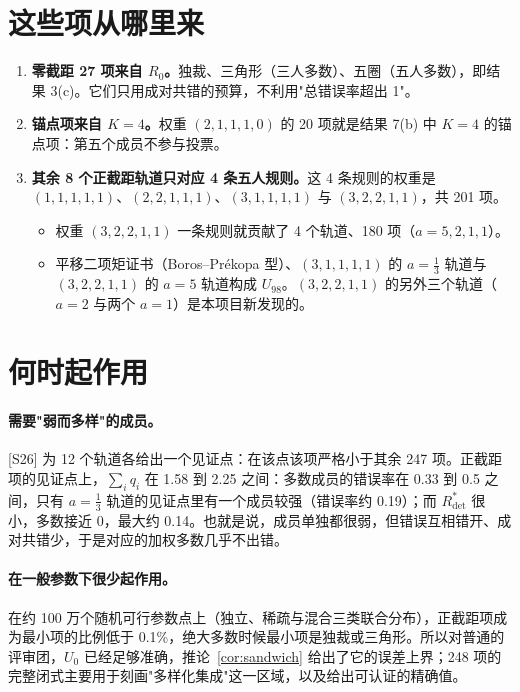 \documentclass[11pt,a4paper]{article}
\theoremstyle{remark}
\newcommand{\Rdet}{R^*_{\mathrm{det}}}
\begin{document}
\section{这些项从哪里来}

\begin{enumerate}
\item \textbf{零截距 27 项来自 $R_0$。}独裁、三角形（三人多数）、五圈（五人多数），即结果 3(c)。它们只用成对共错的预算，不利用"总错误率超出 1"。
\item \textbf{锚点项来自 $K=4$。}权重 $(2,1,1,1,0)$ 的 20 项就是结果 7(b) 中 $K=4$ 的锚点项：第五个成员不参与投票。
\item \textbf{其余 8 个正截距轨道只对应 4 条五人规则。}这 4 条规则的权重是 $(1,1,1,1,1)$、$(2,2,1,1,1)$、$(3,1,1,1,1)$ 与 $(3,2,2,1,1)$，共 201 项。
  \begin{itemize}
  \item 权重 $(3,2,2,1,1)$ 一条规则就贡献了 4 个轨道、180 项（$a=5,2,1,1$）。
  \item 平移二项矩证书（Boros–Prékopa 型）、$(3,1,1,1,1)$ 的 $a=\tfrac13$ 轨道与 $(3,2,2,1,1)$ 的 $a=5$ 轨道构成 $U_{98}$。$(3,2,2,1,1)$ 的另外三个轨道（$a=2$ 与两个 $a=1$）是本项目新发现的。
  \end{itemize}
\end{enumerate}

\section{何时起作用}

\paragraph{需要"弱而多样"的成员。}[S26] 为 12 个轨道各给出一个见证点：在该点该项严格小于其余 247 项。正截距项的见证点上，$\sum_iq_i$ 在 1.58 到 2.25 之间：多数成员的错误率在 0.33 到 0.5 之间，只有 $a=\tfrac13$ 轨道的见证点里有一个成员较强（错误率约 0.19）；而 $\Rdet$ 很小，多数接近 0，最大约 0.14。也就是说，成员单独都很弱，但错误互相错开、成对共错少，于是对应的加权多数几乎不出错。

\paragraph{在一般参数下很少起作用。}在约 100 万个随机可行参数点上（独立、稀疏与混合三类联合分布），正截距项成为最小项的比例低于 0.1\%，绝大多数时候最小项是独裁或三角形。所以对普通的评审团，$U_0$ 已经足够准确，推论~\ref{cor:sandwich} 给出了它的误差上界；248 项的完整闭式主要用于刻画"多样化集成"这一区域，以及给出可认证的精确值。
\end{document}
